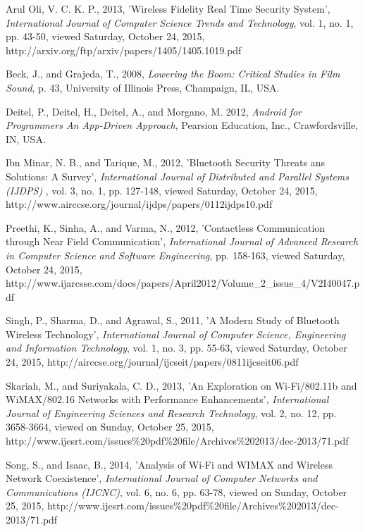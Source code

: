 \documentclass[12pt,svgnames,smaller]{article} %
\begin{document}
\newpage
\begin{thebibliography}{ 10 }


Arul Oli, V. C. K. P., 2013, 'Wireless Fidelity Real Time Security System', \emph{International Journal of Computer Science Trends and Technology},	vol. 1, no. 1, pp. 43-50, viewed Saturday, October 24, 2015, http://arxiv.org/ftp/arxiv/papers/1405/1405.1019.pdf


Beck, J., and Grajeda, T., 2008,
\emph{Lowering the Boom: Critical Studies in Film Sound}, p. 43, University of Illinois Press, Champaign, IL, USA. 


Deitel, P., Deitel, H., Deitel, A., and Morgano, M. 2012, \emph{Android for Programmers An App-Driven Approach}, Pearsion Education, Inc., Crawfordsville, IN, USA.


Ibn Minar, N. B., and Tarique, M., 2012, 'Bluetooth Security Threats ans Solutions: A Survey', \emph{International Journal of Distributed and Parallel Systems (IJDPS)} , vol. 3, no. 1, pp. 127-148, viewed Saturday, October 24, 2015, http://www.airccse.org/journal/ijdps/papers/0112ijdps10.pdf


Preethi, K., Sinha, A., and Varma, N., 2012, 'Contactless Communication through Near Field Communication', \emph{International Journal of Advanced Research in Computer Science and Software Engineering}, pp. 158-163, viewed Saturday, October 24, 2015, http://www.ijarcsse.com/docs/papers/April2012/Volume\_2\_issue\_4/V2I40047.pdf


Singh, P., Sharma, D., and Agrawal, S., 2011, 'A Modern Study of Bluetooth Wireless Technology', \emph{International Journal of Computer Science, Engineering and Information Technology}, vol. 1, no. 3, pp. 55-63, viewed Saturday, October 24, 2015, http://airccse.org/journal/ijcseit/papers/0811ijcseit06.pdf


Skariah, M., and Suriyakala, C. D., 2013, 'An Exploration on Wi-Fi/802.11b and WiMAX/802.16 Networks with Performance Enhancements', \emph{International Journal of Engineering Sciences and Research Technology}, vol. 2, no. 12, pp. 3658-3664, viewed on Sunday, October 25, 2015, http://www.ijesrt.com/issues\%20pdf\%20file/Archives\%202013/dec-2013/71.pdf


Song, S., and Isaac, B., 2014, 'Analysis of Wi-Fi and WIMAX and Wireless Network Coexistence', \emph{International Journal of Computer Networks and Communications (IJCNC)}, vol. 6, no. 6, pp. 63-78, viewed on Sunday, October 25, 2015, http://www.ijesrt.com/issues\%20pdf\%20file/Archives\%202013/dec-2013/71.pdf


\end{thebibliography}

\end{document}
